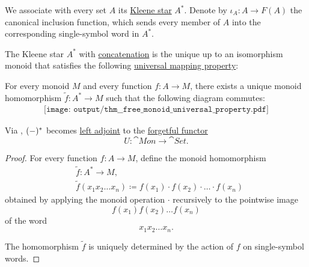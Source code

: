 \begin{theorem}\label{thm:free_monoid_universal_property}
  We associate with every set \( A \) its \hyperref[def:formal_language/kleene_star]{Kleene star} \( A^* \). Denote by \( \iota_A: A \to F(A) \) the canonical inclusion function, which sends every member of \( A \) into the corresponding single-symbol word in \( A^* \).

  The Kleene star \( A^* \) with \hyperref[def:formal_language/concatenation]{concatenation} is the unique up to an isomorphism monoid that satisfies the following \hyperref[rem:universal_mapping_property]{universal mapping property}:
  \begin{displayquote}
    For every monoid \( M \) and every function \( f: A \to M \), there exists a unique monoid homomorphism \( \widetilde{f}: A^* \to M \) such that the following diagram commutes:
    \begin{equation}\label{eq:thm:free_monoid_universal_property/diagram}
      \begin{aligned}
        \texttt{[image: output/thm\_\_free\_monoid\_universal\_property.pdf]}
      \end{aligned}
    \end{equation}
  \end{displayquote}

  Via , \( (\Anon*)^* \) becomes \hyperref[def:category_adjunction]{left adjoint} to the \hyperref[def:concrete_category]{forgetful functor}
  \begin{equation*}
    U: \cat{Mon} \to \cat{Set}.
  \end{equation*}
\end{theorem}
\begin{proof}
  For every function \( f: A \to M \), define the monoid homomorphism
  \begin{equation*}
    \begin{aligned}
      &\widetilde{f}: A^* \to M, \\
      &\widetilde{f}(x_1 x_2 \ldots x_n) \coloneqq f(x_1) \cdot f(x_2) \cdot \ldots \cdot f(x_n)
    \end{aligned}
  \end{equation*}
  obtained by applying the monoid operation \( \cdot \) recursively to the pointwise image
  \begin{equation*}
    f(x_1) f(x_2) \ldots f(x_n)
  \end{equation*}
  of the word
  \begin{equation*}
    x_1 x_2 \ldots x_n.
  \end{equation*}

  The homomorphism \( \widetilde{f} \) is uniquely determined by the action of \( f \) on single-symbol words.
\end{proof}

